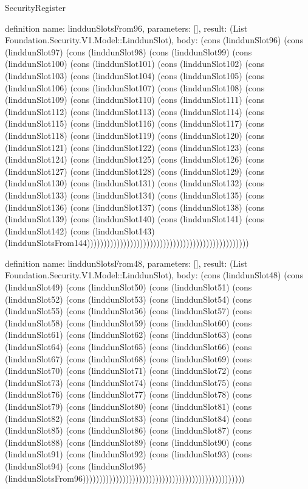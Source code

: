 \begin{lexlean}{SecurityRegister}
\begin{semanticmodule}
definition{
  name: linddunSlotsFrom96,
  parameters: [],
  result: (List Foundation.Security.V1.Model::LinddunSlot),
  body: (cons (linddunSlot96) (cons (linddunSlot97) (cons (linddunSlot98) (cons (linddunSlot99) (cons (linddunSlot100) (cons (linddunSlot101) (cons (linddunSlot102) (cons (linddunSlot103) (cons (linddunSlot104) (cons (linddunSlot105) (cons (linddunSlot106) (cons (linddunSlot107) (cons (linddunSlot108) (cons (linddunSlot109) (cons (linddunSlot110) (cons (linddunSlot111) (cons (linddunSlot112) (cons (linddunSlot113) (cons (linddunSlot114) (cons (linddunSlot115) (cons (linddunSlot116) (cons (linddunSlot117) (cons (linddunSlot118) (cons (linddunSlot119) (cons (linddunSlot120) (cons (linddunSlot121) (cons (linddunSlot122) (cons (linddunSlot123) (cons (linddunSlot124) (cons (linddunSlot125) (cons (linddunSlot126) (cons (linddunSlot127) (cons (linddunSlot128) (cons (linddunSlot129) (cons (linddunSlot130) (cons (linddunSlot131) (cons (linddunSlot132) (cons (linddunSlot133) (cons (linddunSlot134) (cons (linddunSlot135) (cons (linddunSlot136) (cons (linddunSlot137) (cons (linddunSlot138) (cons (linddunSlot139) (cons (linddunSlot140) (cons (linddunSlot141) (cons (linddunSlot142) (cons (linddunSlot143) (linddunSlotsFrom144)))))))))))))))))))))))))))))))))))))))))))))))))
}

definition{
  name: linddunSlotsFrom48,
  parameters: [],
  result: (List Foundation.Security.V1.Model::LinddunSlot),
  body: (cons (linddunSlot48) (cons (linddunSlot49) (cons (linddunSlot50) (cons (linddunSlot51) (cons (linddunSlot52) (cons (linddunSlot53) (cons (linddunSlot54) (cons (linddunSlot55) (cons (linddunSlot56) (cons (linddunSlot57) (cons (linddunSlot58) (cons (linddunSlot59) (cons (linddunSlot60) (cons (linddunSlot61) (cons (linddunSlot62) (cons (linddunSlot63) (cons (linddunSlot64) (cons (linddunSlot65) (cons (linddunSlot66) (cons (linddunSlot67) (cons (linddunSlot68) (cons (linddunSlot69) (cons (linddunSlot70) (cons (linddunSlot71) (cons (linddunSlot72) (cons (linddunSlot73) (cons (linddunSlot74) (cons (linddunSlot75) (cons (linddunSlot76) (cons (linddunSlot77) (cons (linddunSlot78) (cons (linddunSlot79) (cons (linddunSlot80) (cons (linddunSlot81) (cons (linddunSlot82) (cons (linddunSlot83) (cons (linddunSlot84) (cons (linddunSlot85) (cons (linddunSlot86) (cons (linddunSlot87) (cons (linddunSlot88) (cons (linddunSlot89) (cons (linddunSlot90) (cons (linddunSlot91) (cons (linddunSlot92) (cons (linddunSlot93) (cons (linddunSlot94) (cons (linddunSlot95) (linddunSlotsFrom96)))))))))))))))))))))))))))))))))))))))))))))))))
}


\end{semanticmodule}
\end{lexlean}
